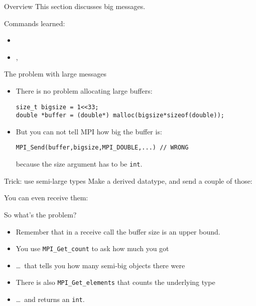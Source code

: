 
\begin{numberedframe}{Overview}
  This section discusses big messages.

  Commands learned:
  \begin{itemize}
  \item {}
  \item {},
  \end{itemize}
\end{numberedframe}

\begin{numberedframe}{The problem with large messages}
  \begin{itemize}
  \item There is no problem allocating large buffers:
\begin{lstlisting}
size_t bigsize = 1<<33;
double *buffer = (double*) malloc(bigsize*sizeof(double));
\end{lstlisting}
\item But you can not tell MPI how big the buffer is:
\begin{lstlisting}
MPI_Send(buffer,bigsize,MPI_DOUBLE,...) // WRONG
\end{lstlisting}
because the size argument has to be \lstinline{int}.
  \end{itemize}
\end{numberedframe}

\begin{numberedframe}{Trick: use semi-large types}
  Make a derived datatype, and send a couple of those:
  

  You can even receive them:

\end{numberedframe}

\begin{numberedframe}{So what's the problem?}
  \begin{itemize}
  \item Remember that in a receive call the buffer size is an upper bound.
  \item You use \lstinline{MPI_Get_count} to ask how much you got
  \item \ldots~that tells you how many semi-big objects there were
  \item There is also \lstinline{MPI_Get_elements} that counts the underlying type
  \item \ldots~and returns an \lstinline{int}.
  \end{itemize}
\end{numberedframe}

